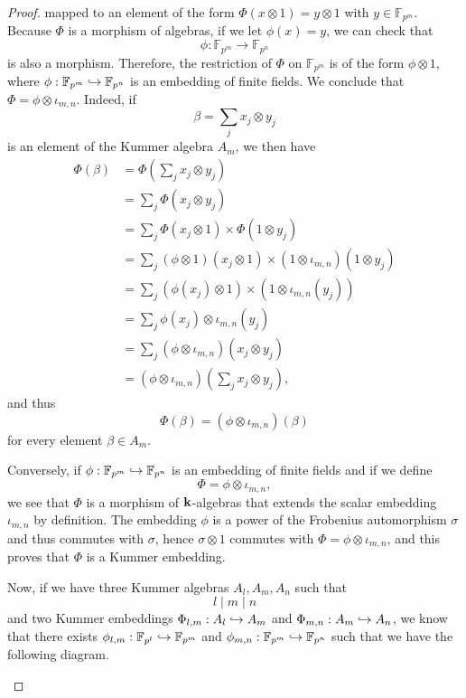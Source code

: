 \begin{proof}
mapped to an element of the form $\Phi(x\otimes1)=y\otimes1$ with $y\in\mathbb{F}_{p^m}$.
Because $\Phi$ is a morphism of algebras, if we
let $\phi(x)=y$, we can check that
\[
  \phi:\mathbb{F}_{p^m}\to\mathbb{F}_{p^n}
\]
is also a morphism. Therefore, the restriction of $\Phi$ on
$\mathbb{F}_{p^m}$ is of the form $\phi\otimes1$, where
$\phi:\mathbb{F}_{p^m}\hookrightarrow\mathbb{F}_{p^n}$ is an embedding
of finite fields. We conclude that $\Phi=\phi\otimes\iota_{m, n}$. Indeed, if 
\[
  \beta=\sum_{j}x_j\otimes y_j
\]
is an element of the Kummer algebra $A_m$, we then have
\begin{align*}
  \Phi(\beta) &= \Phi(\sum_{j}x_j\otimes y_j) \\
  &= \sum_j\Phi(x_j\otimes y_j)\\
  &= \sum_j\Phi(x_j\otimes1)\times\Phi(1\otimes y_j)\\
  &= \sum_j(\phi\otimes1)(x_j\otimes1)\times(1\otimes\iota_{m, n})(1\otimes y_j)\\
  &= \sum_j (\phi(x_j)\otimes1)\times(1\otimes\iota_{m, n}(y_j))\\
  &= \sum_j \phi(x_j)\otimes\iota_{m, n}(y_j)\\
  &= \sum_j (\phi\otimes\iota_{m, n})(x_j\otimes y_j)\\
  &= (\phi\otimes\iota_{m, n})(\sum_jx_j\otimes y_j),
\end{align*}
and thus
\[
  \Phi(\beta) = (\phi\otimes\iota_{m, n})(\beta)
\]
for every element $\beta\in A_m$.

Conversely, if $\phi:\mathbb{F}_{p^{m}}\hookrightarrow\mathbb{F}_{p^n}$ is an embedding of
finite fields and if we define
\[
  \Phi = \phi\otimes\iota_{m, n},
\]
we see that $\Phi$ is a morphism of $\mathbf{k}$-algebras that extends the scalar embedding
$\iota_{m, n}$ by definition.
The embedding $\phi$ is a power of the Frobenius automorphism $\sigma$ and thus
commutes with $\sigma$, hence $\sigma\otimes1$ commutes with
$\Phi=\phi\otimes\iota_{m, n}$, and this proves that $\Phi$ is a Kummer
embedding.

Now, if we have three Kummer algebras $A_l, A_m, A_n$ such that 
\[
  l\mid m\mid n
\]
and two Kummer embeddings $\Phi_{l, m}:A_l\hookrightarrow A_m$ and $\Phi_{m, n}:A_m\hookrightarrow
A_n$, we know that there exists $\phi_{l,
m}:\mathbb{F}_{p^l}\hookrightarrow\mathbb{F}_{p^m}$ and $\phi_{m,
n}:\mathbb{F}_{p^{m}}\hookrightarrow\mathbb{F}_{p^{n}}$ such that we have the following
diagram.
\begin{center}
\end{center}
\end{proof}

